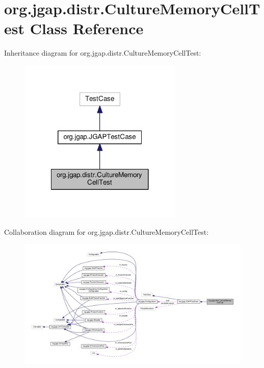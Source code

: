 \hypertarget{classorg_1_1jgap_1_1distr_1_1_culture_memory_cell_test}{\section{org.\-jgap.\-distr.\-Culture\-Memory\-Cell\-Test Class Reference}
\label{classorg_1_1jgap_1_1distr_1_1_culture_memory_cell_test}
}


Inheritance diagram for org.\-jgap.\-distr.\-Culture\-Memory\-Cell\-Test\-:
\nopagebreak
\begin{figure}[H]
\begin{center}
\leavevmode
\includegraphics[width=222pt]{classorg_1_1jgap_1_1distr_1_1_culture_memory_cell_test__inherit__graph}
\end{center}
\end{figure}


Collaboration diagram for org.\-jgap.\-distr.\-Culture\-Memory\-Cell\-Test\-:
\nopagebreak
\begin{figure}[H]
\begin{center}
\leavevmode
\includegraphics[width=350pt]{classorg_1_1jgap_1_1distr_1_1_culture_memory_cell_test__coll__graph}
\end{center}
\end{figure}
